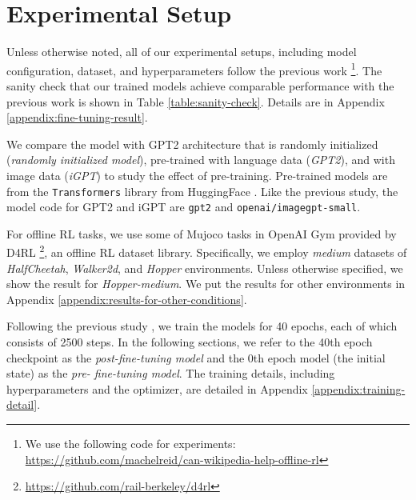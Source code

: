 \section{Experimental Setup}
\label{subsection:experimental-setup}

Unless otherwise noted, all of our experimental setups, including model configuration, dataset, and hyperparameters follow the previous work \cite{reid2022can} \footnote{We use the following code for experiments: \href{https://github.com/machelreid/can-wikipedia-help-offline-rl}{https://github.com/machelreid/can-wikipedia-help-offline-rl}}. The sanity check that our trained models achieve comparable performance with the previous work is shown in Table \ref{table:sanity-check}. Details are in Appendix \ref{appendix:fine-tuning-result}. 

We compare the model with GPT2 architecture \cite{radford2019language} that is randomly initialized (\textit{randomly initialized model}), pre-trained with language data (\textit{GPT2}), and with image data (\textit{iGPT}) to study the effect of pre-training. Pre-trained models are from the \lstinline{Transformers} library from HuggingFace \cite{wolf-etal-2020-transformers}. Like the previous study, the model code for GPT2 and iGPT are \lstinline{gpt2} and \lstinline{openai/imagegpt-small}.

For offline RL tasks, we use some of Mujoco tasks \cite{todorov2012mujoco} in OpenAI Gym \cite{brockman2016openai} provided by D4RL \cite{fu2020d4rl} \footnote{\href{https://github.com/rail-berkeley/d4rl}{https://github.com/rail-berkeley/d4rl}}, an offline RL dataset library. Specifically, we employ \textit{medium} datasets of \textit{HalfCheetah}, \textit{Walker2d}, and \textit{Hopper} environments. Unless otherwise specified, we show the result for \textit{Hopper-medium}. We put the results for other environments in Appendix \ref{appendix:results-for-other-conditions}.
 
Following the previous study \cite{reid2022can}, we train the models for 40 epochs, each of which consists of 2500 steps. In the following sections, we refer to the 40th epoch checkpoint as the \textit{post-fine-tuning model} and the 0th epoch model (the initial state) as the \textit{pre- fine-tuning model}. The training details, including hyperparameters and the optimizer, are detailed in Appendix \ref{appendix:training-detail}.

